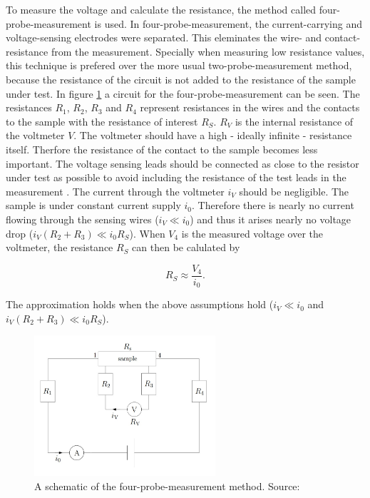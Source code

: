 \documentclass[a4paper]{article}
\begin{document}
To measure the voltage and calculate the resistance, the method called four-probe-measurement is used. In four-probe-measurement, the current-carrying and voltage-sensing electrodes were separated. This eleminates the wire- and contact-resistance from the measurement. Specially when measuring low resistance values, this technique is prefered over the more usual two-probe-measurement method, because the resistance of the circuit is not added to the resistance of the sample under test. In figure \ref{fig:fourprobe} a circuit for the four-probe-measurement can be seen. The resistances $R_1$, $R_2$, $R_3$ and $R_4$ represent resistances in the wires and the contacts to the sample with the resistance of interest $R_S$. $R_V$ is the internal resistance of the voltmeter $V$. The voltmeter should have a high - ideally infinite - resistance itself. Therfore the resistance of the contact to the sample becomes less important. The voltage sensing leads should be connected as close to the resistor under test as possible to avoid including the resistance of the test leads in the measurement \cite{llmh}. The current through the voltmeter $i_V$ should be negligible. The sample is under constant current supply $i_0$. Therefore there is nearly no current flowing through the sensing wires ($i_V \ll i_0$) and thus it arises nearly no voltage drop ($i_V \left( R_2 + R_3 \right) \ll i_0 R_S$). When $V_4$ is the measured voltage over the voltmeter, the resistance $R_S$ can then be calulated by

\begin{equation}
R_S \approx \frac{V_4}{i_0}.
\end{equation}

The approximation holds when the above assumptions hold ($i_V \ll i_0$ and $i_V \left( R_2 + R_3 \right) \ll i_0 R_S$).

\begin{figure}[H]
\captionsetup{singlelinecheck=off}
\centering
\includegraphics[width=0.6\textwidth]{img/fourprobe.jpg}
\caption[blubb]{A schematic of the four-probe-measurement method. Source: \cite{inst2014}}
\label{fig:fourprobe}
\end{figure}
\end{document}
